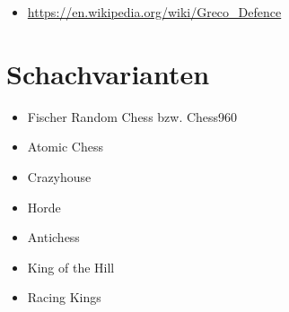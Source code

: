 \documentclass[
  a4paper,
  justified,
  nobib,
]{tufte-handout}
\begin{document}
\begin{itemize}
  \item \url{https://en.wikipedia.org/wiki/Greco_Defence}
\end{itemize}

\pagebreak

\section{Schachvarianten}%
\label{sec:schachvarianten}

\begin{itemize}
  \item Fischer Random Chess bzw. Chess960
  \item Atomic Chess
  \item Crazyhouse
  \item Horde
  \item Antichess
  \item King of the Hill
  \item Racing Kings
\end{itemize}
\end{document}
